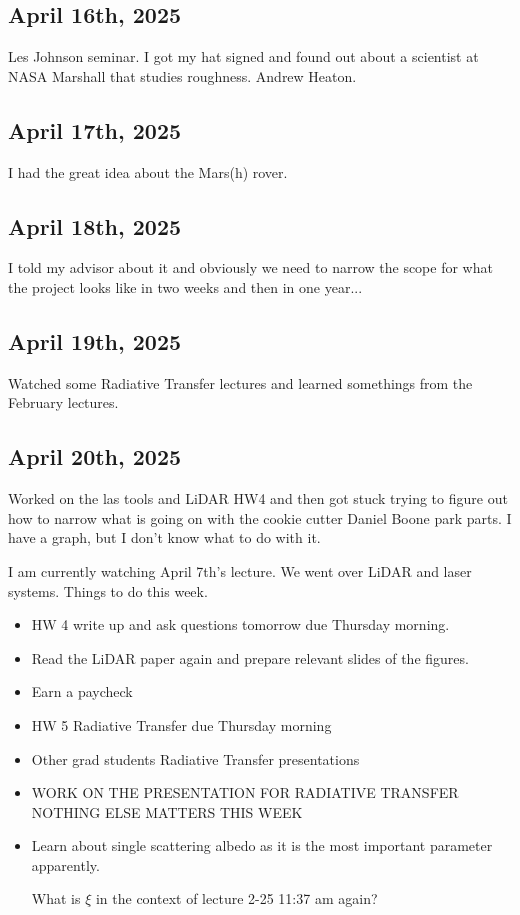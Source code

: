\documentclass{article}
\begin{document}
\subsection{April 16th, 2025}
Les Johnson seminar. I got my hat signed and found out about a scientist at NASA Marshall that studies roughness. Andrew Heaton. 


\subsection{April 17th, 2025}
I had the great idea about the Mars(h) rover. 

\subsection{April 18th, 2025}
I told my advisor about it and obviously we need to narrow the scope for what the project looks like in two weeks and then in one year...

\subsection{April 19th, 2025}
Watched some Radiative Transfer lectures and learned somethings from the February lectures. 


\subsection{April 20th, 2025}
Worked on the las tools and LiDAR HW4 and then got stuck trying to figure out how to narrow what is going on with the cookie cutter Daniel Boone park parts. I have a graph, but I don't know what to do with it. 

I am currently watching April 7th's lecture. We went over LiDAR and laser systems. 
Things to do this week.
\begin{itemize}
    \item HW 4 write up and ask questions tomorrow due Thursday morning. 
    \item Read the LiDAR paper again and prepare relevant slides of the figures. 
    \item Earn a paycheck 
    \item HW 5 Radiative Transfer due Thursday morning
    \item Other grad students Radiative Transfer presentations
    \item WORK ON THE PRESENTATION FOR RADIATIVE TRANSFER NOTHING ELSE MATTERS THIS WEEK
    \item Learn about single scattering albedo as it is the most important parameter apparently.


    What is $\xi$ in the context of lecture 2-25 11:37 am again?

    
\end{itemize}
\end{document}
